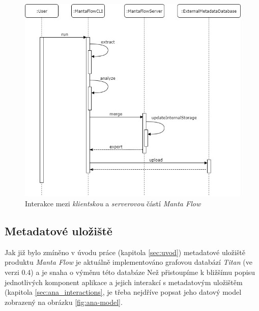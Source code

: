 \begin{figure}
\begin{center}
\includegraphics[width=14cm]{figures/flow_seq}
\caption{Interakce mezi \textit{klientskou} a \textit{serverovou} částí \textit{Manta Flow}}
\label{fig:ana-flow-seq}
\end{center}
\end{figure}

\subsection{Metadatové uložiště}
Jak již bylo zmíněno v úvodu práce (kapitola \ref{sec:uvod}) metadatové uložiště produktu \textit{Manta Flow} je aktuálně implementováno grafovou databází \textit{Titan} (ve verzi 0.4) a je snaha o výměnu této databáze %
Než přistoupíme k bližšímu popisu jednotlivých komponent aplikace a jejich interakcí s metadatovým uložištěm (kapitola \ref{sec:ana_interactions}, je třeba nejdříve popsat jeho datový model zobrazený na obrázku \ref{fig:ana-model}. 


